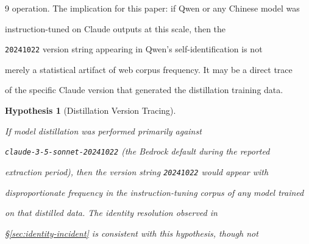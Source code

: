 \documentclass[11pt]{article}
\newtheorem{hypothesis}[theorem]{Hypothesis}
\theoremstyle{definition}
\begin{document}
\begin{thebibliography}{9}
operation. The implication for this paper: if Qwen or any Chinese model was





instruction-tuned on Claude outputs at this scale, then the





\texttt{20241022} version string appearing in Qwen's self-identification is not





merely a statistical artifact of web corpus frequency. It may be a direct trace





of the specific Claude version that generated the distillation training data.











\begin{hypothesis}[Distillation Version Tracing]





\label{hyp:distillation-trace}





If model distillation was performed primarily against





\texttt{claude-3-5-sonnet-20241022} (the Bedrock default during the reported





extraction period), then the version string \texttt{20241022} would appear with





disproportionate frequency in the instruction-tuning corpus of any model trained





on that distilled data. The identity resolution observed in





\S\ref{sec:identity-incident} is consistent with this hypothesis, though not






\end{hypothesis}
\end{thebibliography}
\end{document}
